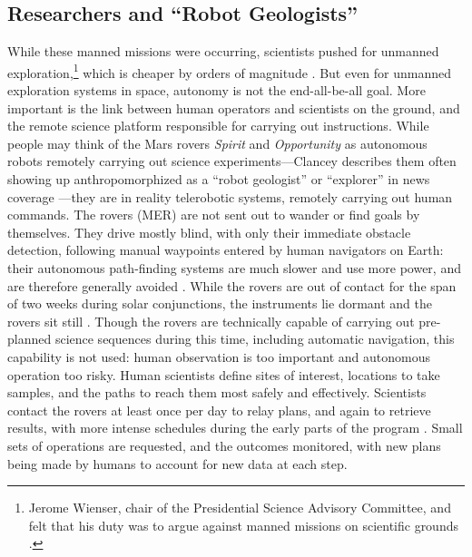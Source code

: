 \subsection{Researchers and ``Robot Geologists''}

 While these manned missions were occurring, scientists
 pushed for unmanned exploration,\footnote{Jerome
 Wienser, chair of the Presidential Science
   Advisory Committee, and felt that his duty was to argue against
   manned missions on scientific grounds \cite[Chapter 2]{Levine}.}
 which is cheaper by orders of magnitude
 \cite[p. 66]{coxMurray}. But even for
unmanned exploration systems in space, autonomy is not the
end-all-be-all goal. More important is the link between human
operators and scientists on the ground, and the remote science
platform responsible for carrying out instructions. 
While people may
think of the Mars rovers \emph{Spirit} and \emph{Opportunity} as
autonomous robots remotely carrying out science experiments---Clancey
describes them often showing up anthropomorphized as a ``robot 
geologist'' or 
``explorer'' in news coverage \cite[p. 7]{clancey}---they are
in reality telerobotic systems, remotely carrying out human commands.
The rovers (MER) are not 
sent out to wander or find goals by themselves. They drive mostly
blind, with only their immediate obstacle detection, following manual
waypoints entered by human navigators on Earth: their autonomous
path-finding systems are much slower and use more power, and are
therefore generally avoided \cite[p. 118]{clancey}. While the rovers
are out of contact for the span of two weeks during solar
conjunctions, the instruments lie dormant and the rovers sit
still \cite[p. 25]{clancey}. Though the rovers are technically capable of
carrying out pre-planned science sequences during this time, including
automatic navigation, this capability is not used: human observation
is too important and
autonomous operation too risky. Human
scientists define sites of interest, locations to take samples, and
the paths to reach them most safely and effectively. Scientists
contact the rovers at least once per day to relay plans, and again
to retrieve results, with more intense schedules during the early
parts of the program \cite[p. 58]{clancey}. Small sets of
operations are requested, and the outcomes monitored, with new plans
being made by humans to account for new data at each step.

